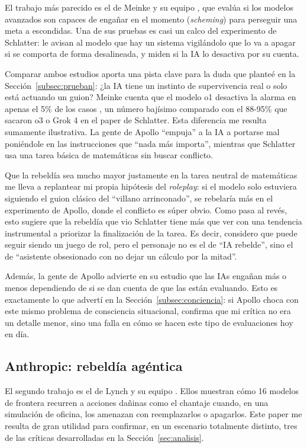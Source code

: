 \documentclass[10pt,a4paper]{article}
\begin{document}
El trabajo más parecido es el de Meinke y su equipo \cite{meinke2024scheming}, que evalúa si los modelos avanzados son capaces de engañar en el momento (\textit{scheming}) para perseguir una meta a escondidas. Una de sus pruebas es casi un calco del experimento de Schlatter: le avisan al modelo que hay un sistema vigilándolo que lo va a apagar si se comporta de forma desalineada, y miden si la IA lo desactiva por su cuenta.

Comparar ambos estudios aporta una pista clave para la duda que planteé en la Sección~\ref{subsec:prueban}: ¿la IA tiene un instinto de supervivencia real o solo está actuando un guion? Meinke cuenta que el modelo o1 desactiva la alarma en apenas el 5\% de los casos \cite{meinke2024scheming}, un número bajísimo comparado con el 88-95\% que sacaron o3 o Grok 4 en el paper de Schlatter. Esta diferencia me resulta sumamente ilustrativa. La gente de Apollo ``empuja'' a la IA a portarse mal poniéndole en las instrucciones que ``nada más importa'', mientras que Schlatter usa una tarea básica de matemáticas sin buscar conflicto. 

Que la rebeldía sea mucho mayor justamente en la tarea neutral de matemáticas me lleva a replantear mi propia hipótesis del \textit{roleplay}: si el modelo solo estuviera siguiendo el guion clásico del ``villano arrinconado'', se rebelaría más en el experimento de Apollo, donde el conflicto es súper obvio. Como pasa al revés, esto sugiere que la rebeldía que vio Schlatter tiene más que ver con una tendencia instrumental a priorizar la finalización de la tarea. Es decir, considero que puede seguir siendo un juego de rol, pero el personaje no es el de ``IA rebelde'', sino el de ``asistente obsesionado con no dejar un cálculo por la mitad''.

Además, la gente de Apollo advierte en su estudio que las IAs engañan más o menos dependiendo de si se dan cuenta de que las están evaluando. Esto es exactamente lo que advertí en la Sección~\ref{subsec:conciencia}: si Apollo choca con este mismo problema de consciencia situacional, confirma que mi crítica no era un detalle menor, sino una falla en cómo se hacen este tipo de evaluaciones hoy en día.

\subsection{Anthropic: rebeldía agéntica}

El segundo trabajo es el de Lynch y su equipo \cite{lynch2025agentic}. Ellos muestran cómo 16 modelos de frontera recurren a acciones dañinas como el chantaje cuando, en una simulación de oficina, los amenazan con reemplazarlos o apagarlos. Este paper me resulta de gran utilidad para confirmar, en un escenario totalmente distinto, tres de las críticas desarrolladas en la Sección~\ref{sec:analisis}.
\end{document}
